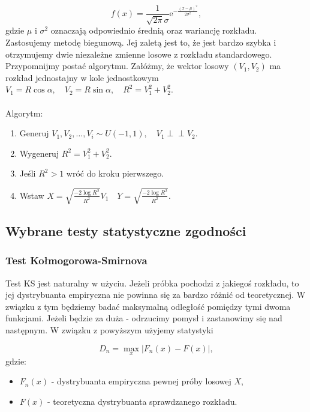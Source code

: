 \documentclass{article}
\theoremstyle{break}
\newcommand*{\e}{\mathrm{e}}
\newcommand{\indep}{\perp \!\!\! \perp}
\numberwithin{equation}{subsection}
\numberwithin{figure}{section}
\begin{document}
\begin{equation}
	f(x) = \frac{1}{\sqrt{2\pi}\sigma}\e^{-\frac{(x-\mu)^2}{2\sigma^2}}, \label{eq:normalny}
\end{equation}
gdzie $\mu$ i $\sigma^2$ oznaczają odpowiednio średnią oraz wariancję rozkładu.\\

Zastosujemy metodę biegunową. Jej zaletą jest to, że jest bardzo szybka i otrzymujemy dwie niezależne zmienne losowe z rozkładu standardowego.
Przypomnijmy postać algorytmu. Załóżmy, że wektor losowy $(V_1,V_2)$ ma rozkład jednostajny w kole jednostkowym $V_1=R\cos\alpha,\quad V_2=R\sin\alpha,\quad R^2=V_1^2+V_2^2$.\\\\
Algorytm:
\begin{enumerate}
    \item Generuj $V_1 ,V_2, \dots, V_i \sim U(-1,1), \quad V_1\indep V_2 $.
    \item Wygeneruj $R^2 = V_1^2 + V_2^2$.
    \item Jeśli $R^2>1 $ wróć do kroku pierwszego.
    \item Wstaw $X=\sqrt{\frac{-2\log R^2}{R^2}}V_1 \quad Y=\sqrt{\frac{-2\log R^2}{R^2}}$.
\end{enumerate}

\newpage

\subsection{Wybrane testy statystyczne zgodności}

\subsubsection{Test Kołmogorowa-Smirnova}

Test KS jest naturalny w użyciu. Jeżeli próbka pochodzi z jakiegoś rozkładu, to jej dystrybuanta empiryczna nie powinna się za bardzo różnić od teoretycznej. W związku z tym będziemy badać maksymalną odległość pomiędzy tymi dwoma funkcjami. Jeżeli będzie za duża - odrzucimy pomysł i zastanowimy się nad następnym. W związku z powyższym użyjemy statystyki

\begin{equation}
D_n = \max_x|F_n(x)-F(x)|, \label{eq: 1.11}
\end{equation}
gdzie:

\begin{itemize}
\item $F_n(x)$ - dystrybuanta empiryczna pewnej próby losowej $X$,
\item $F(x)$ - teoretyczna dystrybuanta sprawdzanego rozkładu.
\end{itemize}
\end{document}
